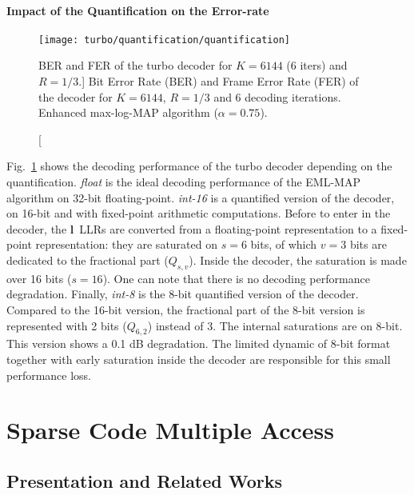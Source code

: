 \paragraph{Impact of the Quantification on the Error-rate}

\begin{figure}[htp]
  \centering
  \texttt{[image: turbo/quantification/quantification]}
  \caption
    [BER and FER of the turbo decoder for $K = 6144$ (6 iters) and $R=1/3$.]
    {Bit Error Rate (BER) and Frame Error Rate (FER) of the decoder for $K =
    6144$, $R=1/3$ and 6 decoding iterations. Enhanced max-log-MAP algorithm
    ($\alpha = 0.75$).}
  \label{plot:alg_turbo_quantification}
\end{figure}

Fig.~\ref{plot:alg_turbo_quantification} shows the decoding performance of the
turbo decoder depending on the quantification. \emph{float} is the ideal
decoding performance of the EML-MAP algorithm on 32-bit floating-point.
\emph{int-16} is a quantified version of the decoder, on 16-bit and with
fixed-point arithmetic computations. Before to enter in the decoder, the
$\bm{l}$~LLRs are converted from a floating-point representation to a
fixed-point representation: they are saturated on $s = 6$ bits, of which $v = 3$
bits are dedicated to the fractional part ($Q_{s,v}$). Inside the decoder, the
saturation is made over 16 bits ($s = 16$). One can note that there is no
decoding performance degradation. Finally, \emph{int-8} is the 8-bit quantified
version of the decoder. Compared to the 16-bit version, the fractional part of
the 8-bit version is represented with 2 bits ($Q_{6,2}$) instead of 3. The
internal saturations are on 8-bit. This version shows a 0.1 dB degradation. The
limited dynamic of 8-bit format together with early saturation inside the
decoder are responsible for this small performance loss.

\section{Sparse Code Multiple Access}
\label{sec:alg_scma}

\subsection{Presentation and Related Works}

